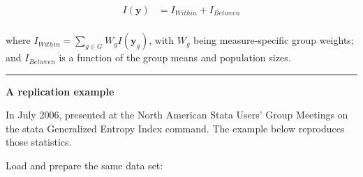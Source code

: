 \documentclass[
]{book}
\begin{document}
\[
\begin{aligned}
I ( \mathbf{y} ) &= I_{Within} + I_{Between} \\
\end{aligned}
\]

\noindent where \(I_{Within} = \sum_{g \in G} W_g I( \mathbf{y}_g )\), with \(W_g\) being measure-specific group weights; and \(I_{Between}\) is a function of the group means and population sizes.

\begin{center}\rule{0.5\linewidth}{0.5pt}\end{center}

\textbf{A replication example}

In July 2006, \textcite{jenkins2006} presented at the North American Stata Users' Group Meetings on the stata Generalized Entropy Index command. The example below reproduces those statistics.

Load and prepare the same data set:
\end{document}
